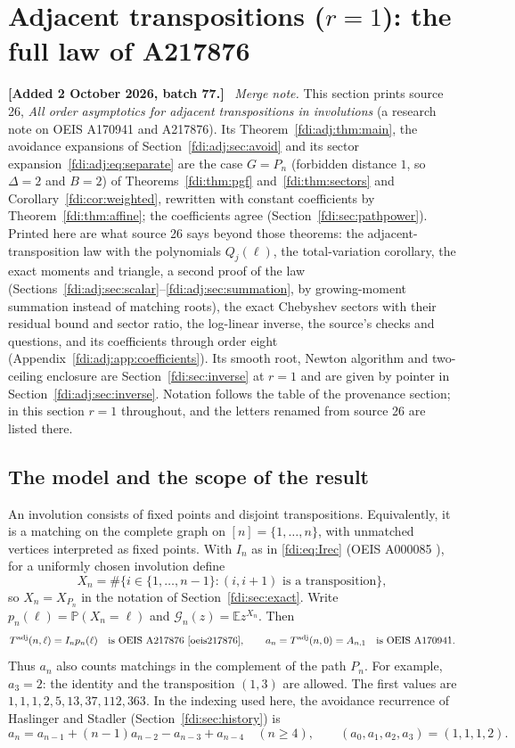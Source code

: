 \documentclass[11pt,letterpaper]{article}
\theoremstyle{remark}\newtheorem{remark}[theorem]{Remark}
\newcommand{\E}{\mathbb E}\newcommand{\Prb}{\mathbb P}\newcommand{\R}{\mathbb R}\newcommand{\C}{\mathbb C}
\newcommand{\Tadj}{T^{\mathrm{adj}}}
\newenvironment{mergenote}[1][2 October 2026, batch 77]{\par\smallskip\begingroup\small\noindent\textbf{[Added #1.]}\ }{\endgroup\par\smallskip}
\begin{document}
\section{Adjacent transpositions (\texorpdfstring{$r=1$}{r = 1}): the full law of A217876}\label{fdi:sec:adjacent}

\begin{mergenote}
\emph{Merge note.} This section prints source 26, \emph{All order asymptotics for adjacent transpositions in involutions} (a research note on OEIS A170941 and A217876). Its Theorem~\ref{fdi:adj:thm:main}, the avoidance expansions of Section~\ref{fdi:adj:sec:avoid} and its sector expansion~\eqref{fdi:adj:eq:separate} are the case $G=P_n$ (forbidden distance $1$, so $\Delta=2$ and $B=2$) of Theorems~\ref{fdi:thm:pgf} and~\ref{fdi:thm:sectors} and Corollary~\ref{fdi:cor:weighted}, rewritten with constant coefficients by Theorem~\ref{fdi:thm:affine}; the coefficients agree (Section~\ref{fdi:sec:pathpower}). Printed here are what source 26 says beyond those theorems: the adjacent-transposition law with the polynomials $Q_j(\ell)$, the total-variation corollary, the exact moments and triangle, a second proof of the law (Sections~\ref{fdi:adj:sec:scalar}--\ref{fdi:adj:sec:summation}, by growing-moment summation instead of matching roots), the exact Chebyshev sectors with their residual bound and sector ratio, the log-linear inverse, the source's checks and questions, and its coefficients through order eight (Appendix~\ref{fdi:adj:app:coefficients}). Its smooth root, Newton algorithm and two-ceiling enclosure are Section~\ref{fdi:sec:inverse} at $r=1$ and are given by pointer in Section~\ref{fdi:adj:sec:inverse}. Notation follows the table of the provenance section; in this section $r=1$ throughout, and the letters renamed from source 26 are listed there.
\end{mergenote}

\subsection{The model and the scope of the result}
An involution consists of fixed points and disjoint transpositions. Equivalently, it is a matching on the complete graph on $[n]=\{1,\ldots,n\}$, with unmatched vertices interpreted as fixed points. With $I_n$ as in \eqref{fdi:eq:Irec} (OEIS A000085 \cite{oeis85}), for a uniformly chosen involution define
\[
 X_n=\#\{i\in\{1,\ldots,n-1\}:(i,i+1)\text{ is a transposition}\},
\]
so $X_n=X_{P_n}$ in the notation of Section~\ref{fdi:sec:exact}. Write $p_n(\ell)=\Prb(X_n=\ell)$ and $\mathcal G_n(z)=\E z^{X_n}$. Then
\[
 \Tadj(n,\ell)=I_np_n(\ell)\quad\text{is OEIS A217876 \cite{oeis217876}},\qquad
 a_n=\Tadj(n,0)=A_{n,1}\quad\text{is OEIS A170941}.
\]
Thus $a_n$ also counts matchings in the complement of the path $P_n$. For example, $a_3=2$: the identity and the transposition $(1,3)$ are allowed. The first values are $1,1,1,2,5,13,37,112,363$. In the indexing used here, the avoidance recurrence of Haslinger and Stadler (Section~\ref{fdi:sec:history}) is
\begin{equation}\label{fdi:adj:eq:avoidrec}
 a_n=a_{n-1}+(n-1)a_{n-2}-a_{n-3}+a_{n-4}\quad(n\ge4),
 \qquad (a_0,a_1,a_2,a_3)=(1,1,1,2).
\end{equation}
\end{document}
